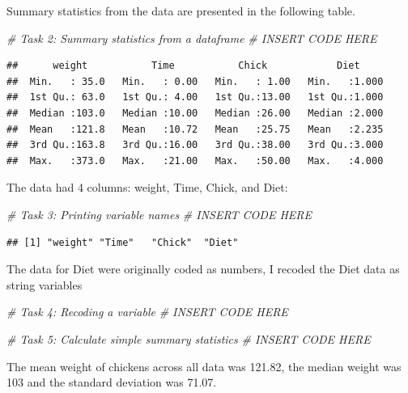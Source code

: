 \documentclass[english,man]{apa6}
\newenvironment{Shaded}{\begin{snugshade}}{\end{snugshade}}
\newcommand{\CommentTok}[1]{\textcolor[rgb]{0.56,0.35,0.01}{\textit{{#1}}}}
\begin{document}
Summary statistics from the data are presented in the following table.

\begin{Shaded}
\begin{Highlighting}[]
\CommentTok{# Task 2: Summary statistics from a dataframe}
\CommentTok{# INSERT CODE HERE}
\end{Highlighting}
\end{Shaded}

\begin{verbatim}
##      weight           Time           Chick            Diet      
##  Min.   : 35.0   Min.   : 0.00   Min.   : 1.00   Min.   :1.000  
##  1st Qu.: 63.0   1st Qu.: 4.00   1st Qu.:13.00   1st Qu.:1.000  
##  Median :103.0   Median :10.00   Median :26.00   Median :2.000  
##  Mean   :121.8   Mean   :10.72   Mean   :25.75   Mean   :2.235  
##  3rd Qu.:163.8   3rd Qu.:16.00   3rd Qu.:38.00   3rd Qu.:3.000  
##  Max.   :373.0   Max.   :21.00   Max.   :50.00   Max.   :4.000
\end{verbatim}

The data had 4 columns: weight, Time, Chick, and Diet:

\begin{Shaded}
\begin{Highlighting}[]
\CommentTok{# Task 3: Printing variable names}
\CommentTok{# INSERT CODE HERE}
\end{Highlighting}
\end{Shaded}

\begin{verbatim}
## [1] "weight" "Time"   "Chick"  "Diet"
\end{verbatim}

The data for Diet were originally coded as numbers, I recoded the Diet
data as string variables

\begin{Shaded}
\begin{Highlighting}[]
\CommentTok{# Task 4: Recoding a variable}
\CommentTok{# INSERT CODE HERE}
\end{Highlighting}
\end{Shaded}

\begin{Shaded}
\begin{Highlighting}[]
\CommentTok{# Task 5: Calculate simple summary statistics}
\CommentTok{# INSERT CODE HERE}
\end{Highlighting}
\end{Shaded}

The mean weight of chickens across all data was 121.82, the median
weight was 103 and the standard deviation was 71.07.
\end{document}
